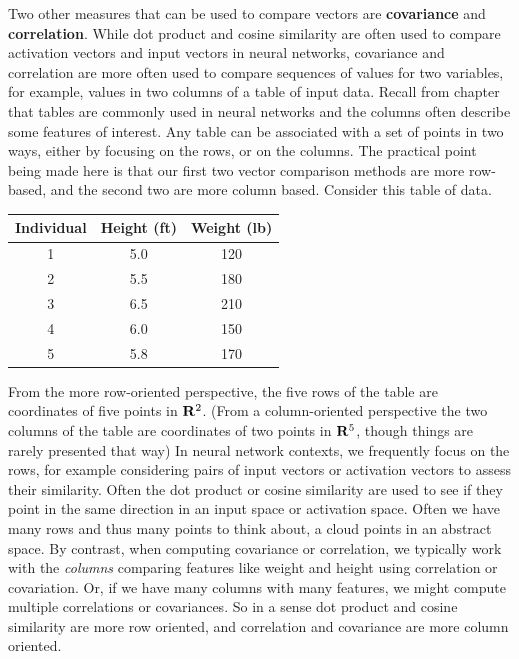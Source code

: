    Two other measures that can be used to compare vectors are \textbf{covariance} and \textbf{correlation}. While dot product and cosine similarity are often used to compare activation vectors and input vectors in neural networks, covariance and correlation are more often used to compare sequences of values for two variables, for example, values in two columns of a table of input data. Recall from chapter  that tables 
are commonly used in neural networks and the columns often describe some
features of interest. Any table can be associated with a set of points in two ways, either by focusing on the rows, or on the columns. The practical point being made here is that our first two vector comparison methods are more row-based, and the second two are more column based. Consider this table of data.
\begin{center}
\begin{tabular}{ccc}
\textbf{Individual} & \textbf{Height (ft)} & \textbf{Weight (lb)} \\
\hline
1 & 5.0 & 120 \\
2 & 5.5 & 180 \\
3 & 6.5 & 210 \\
4 & 6.0 & 150 \\
5 & 5.8 & 170 \\
\end{tabular}
\end{center}
From the more row-oriented perspective, the five rows of  the table are coordinates of five points in ${\bf R}^2$. (From a column-oriented perspective the two columns of the table are coordinates of two  points in ${\bf R}^5$, though things are rarely presented that way) In neural network contexts, we frequently focus on the rows, for example considering pairs of input vectors or 
activation vectors to assess their similarity. Often the dot product or cosine 
similarity are used to see if they point in the same direction in an input 
space or activation space. Often we have many rows and thus many points to 
think about, a cloud points in an abstract space. By contrast, when computing 
covariance or correlation, we typically work with the \emph{columns} comparing features like weight and height using correlation or covariation. Or, if we have many columns with many features, we might compute 
multiple correlations or covariances. So in a sense dot product and cosine 
similarity are more row oriented, and correlation and covariance are more 
column oriented.

   
